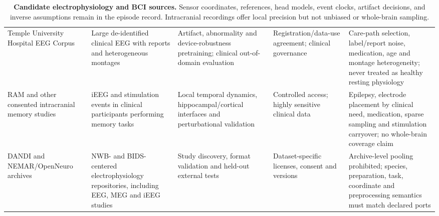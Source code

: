 \begin{table}[!h]
\begin{tabularx}{\textwidth}{@{}p{}p{}p{}p{}X@{}}
Temple University Hospital EEG Corpus \citep{obeid2016tuh} &
Large de-identified clinical EEG with reports and heterogeneous montages &
Artifact, abnormality and device-robustness pretraining; clinical
out-of-domain evaluation &
Registration/data-use agreement; clinical governance &
Care-path selection, label/report noise, medication, age and montage
heterogeneity; never treated as healthy resting physiology\\

RAM and other consented intracranial memory studies &
iEEG and stimulation events in clinical participants performing memory tasks &
Local temporal dynamics, hippocampal/cortical interfaces and perturbational
validation &
Controlled access; highly sensitive clinical data &
Epilepsy, electrode placement by clinical need, medication, sparse sampling
and stimulation carryover; no whole-brain coverage claim\\

DANDI and NEMAR/OpenNeuro archives &
NWB- and BIDS-centered electrophysiology repositories, including EEG, MEG and
iEEG studies &
Study discovery, format validation and held-out external tests &
Dataset-specific licenses, consent and versions &
Archive-level pooling prohibited; species, preparation, task, coordinate and
preprocessing semantics must match declared ports\\
\bottomrule
\end{tabularx}
\caption{\textbf{Candidate electrophysiology and BCI sources.} Sensor
coordinates, references, head models, event clocks, artifact decisions, and
inverse assumptions remain in the episode record. Intracranial recordings
offer local precision but not unbiased or whole-brain sampling.}
\label{tab:appendix-electrophysiology}
\end{table}

